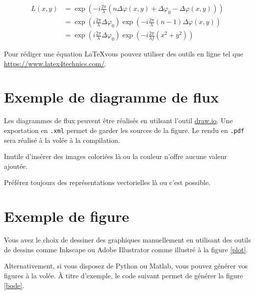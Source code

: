 \documentclass{heig-tb}
\begin{document}
\begin{equation} \label{eq:1}
\begin{split}
L(x,y) &= \exp\left( - i\frac{{2\pi }}{\lambda }\left( {n\Delta \varphi (x,y) + \Delta {\varphi _0} - \Delta \varphi (x,y)} \right)\right)\\
 &= \exp\left({{i\frac{{2\pi }}{\lambda }\Delta {\varphi _0}}}\right)\exp\left({{ - i\frac{{2\pi }}{\lambda }(n - 1)\Delta \varphi (x,y)}}\right)\\
 &= {\exp\left({i\frac{{2\pi }}{\lambda }\Delta {\varphi _0}}\right)}{\exp\left({ - i\frac{{2\pi }}{{\lambda f}}({x^2} + {y^2})}\right)}
\end{split}
\end{equation}

Pour rédiger une équation \LaTeX vous pouvez utiliser des outils en ligne tel que \url{https://www.latex4technics.com/}.

\clearpage
\section{Exemple de diagramme de flux}

Les diagrammes de flux peuvent être réalisés en utilsant l'outil \url{draw.io}. Une exportation en \texttt{.xml} permet de garder les sources de la figure. Le rendu en \texttt{.pdf} sera réalisé à la volée à la compilation.


Inutile d'insérer des images coloriées là ou la couleur n'offre aucune valeur ajoutée.

Préférez toujours des représentations vectorielles là ou c'est possible.

\clearpage
\section{Exemple de figure}

Vous avez le choix de dessiner des graphiques manuellement en utilisant des outils de dessins comme Inkscape ou Adobe Illustrator comme illustré à la figure \ref{plot}.


Alternativement, si vous disposez de Python ou Matlab, vous pouvez générer vos figures à la volée. À titre d'exemple, le code suivant permet de générer la figure \ref{bode}.


\end{document}
